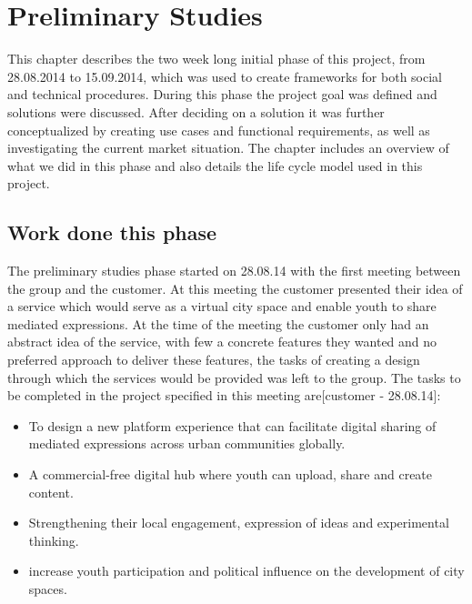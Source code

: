 \chapter{Preliminary Studies}
\label{chap:Prelim}

This chapter describes the two week long initial phase of this project, from 28.08.2014 to 15.09.2014, which was used to create frameworks for both social and technical procedures. During this phase the project goal was defined and solutions were discussed. After deciding on a solution it was further conceptualized by creating use cases and functional requirements, as well as investigating the current market situation. The chapter includes an overview of what we did in this phase and also details the life cycle model used in this project.

\section{Work done this phase}
\label{sec:PrelimWork}
The preliminary studies phase started on 28.08.14 with the first meeting between the group and the customer. At this meeting the customer presented their idea of a service which would serve as a virtual city space and enable youth to share mediated expressions. At the time of the meeting the customer only had an abstract idea of the service, with few a concrete features they wanted and no preferred approach to deliver these features, the tasks of creating a design through which the services would be provided was left to the group. The tasks to be completed in the project specified in this meeting are[customer - 28.08.14]:
\begin{itemize}
  \item To design a new platform experience that can facilitate digital sharing of mediated expressions across urban communities globally.
  \item A commercial-free digital hub where youth can upload, share and create content.
  \item Strengthening their local engagement, expression of ideas and experimental thinking.
  \item increase youth participation and political influence on the development of city spaces.
\end{itemize}

